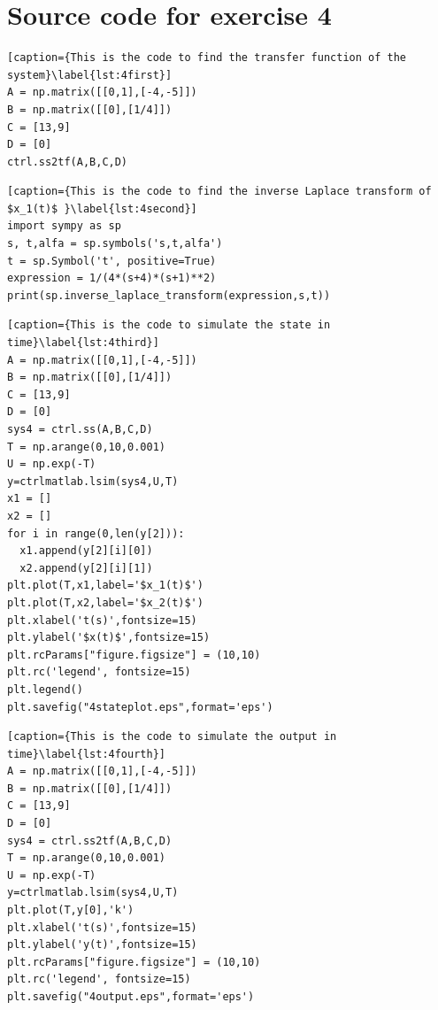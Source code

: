 \documentclass[a4paper,11pt]{article}
\begin{document}
\section{Source code for exercise 4}
\begin{lstlisting}[caption={This is the code to find the transfer function of the system}\label{lst:4first}] 
A = np.matrix([[0,1],[-4,-5]])
B = np.matrix([[0],[1/4]])
C = [13,9]
D = [0]
ctrl.ss2tf(A,B,C,D)
\end{lstlisting}
\begin{lstlisting}[caption={This is the code to find the inverse Laplace transform of $x_1(t)$ }\label{lst:4second}]
import sympy as sp
s, t,alfa = sp.symbols('s,t,alfa')
t = sp.Symbol('t', positive=True)
expression = 1/(4*(s+4)*(s+1)**2)
print(sp.inverse_laplace_transform(expression,s,t))
\end{lstlisting}
\begin{lstlisting}[caption={This is the code to simulate the state in time}\label{lst:4third}]
A = np.matrix([[0,1],[-4,-5]])
B = np.matrix([[0],[1/4]])
C = [13,9]
D = [0]
sys4 = ctrl.ss(A,B,C,D)
T = np.arange(0,10,0.001)
U = np.exp(-T)
y=ctrlmatlab.lsim(sys4,U,T)
x1 = []
x2 = []
for i in range(0,len(y[2])):  
  x1.append(y[2][i][0])
  x2.append(y[2][i][1])
plt.plot(T,x1,label='$x_1(t)$')
plt.plot(T,x2,label='$x_2(t)$')
plt.xlabel('t(s)',fontsize=15)
plt.ylabel('$x(t)$',fontsize=15)
plt.rcParams["figure.figsize"] = (10,10)
plt.rc('legend', fontsize=15)
plt.legend()
plt.savefig("4stateplot.eps",format='eps')
\end{lstlisting}
\begin{lstlisting}[caption={This is the code to simulate the output in time}\label{lst:4fourth}]
A = np.matrix([[0,1],[-4,-5]])
B = np.matrix([[0],[1/4]])
C = [13,9]
D = [0]
sys4 = ctrl.ss2tf(A,B,C,D)
T = np.arange(0,10,0.001)
U = np.exp(-T)
y=ctrlmatlab.lsim(sys4,U,T)
plt.plot(T,y[0],'k')
plt.xlabel('t(s)',fontsize=15)
plt.ylabel('y(t)',fontsize=15)
plt.rcParams["figure.figsize"] = (10,10)
plt.rc('legend', fontsize=15)
plt.savefig("4output.eps",format='eps')
\end{lstlisting}
\end{document}
